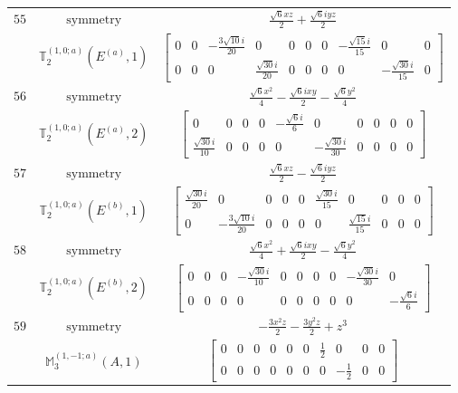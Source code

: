 \documentclass[fleqn,8pt,landscape]{jsarticle}
\begin{document}
\begin{longtable}{ccc}
$ 55 $ & $ \text{symmetry} $ & $ \frac{\sqrt{6} x z}{2} + \frac{\sqrt{6} i y z}{2} $ \\
$  $ & $ \mathbb{T}_{2}^{(1,0;a)}(E^{(a)},1) $ & $ \begin{bmatrix} 0 & 0 & - \frac{3 \sqrt{10} i}{20} & 0 & 0 & 0 & 0 & - \frac{\sqrt{15} i}{15} & 0 & 0 \\ 0 & 0 & 0 & \frac{\sqrt{30} i}{20} & 0 & 0 & 0 & 0 & - \frac{\sqrt{30} i}{15} & 0 \end{bmatrix} $ \\ \hline
$ 56 $ & $ \text{symmetry} $ & $ \frac{\sqrt{6} x^{2}}{4} - \frac{\sqrt{6} i x y}{2} - \frac{\sqrt{6} y^{2}}{4} $ \\
$  $ & $ \mathbb{T}_{2}^{(1,0;a)}(E^{(a)},2) $ & $ \begin{bmatrix} 0 & 0 & 0 & 0 & - \frac{\sqrt{6} i}{6} & 0 & 0 & 0 & 0 & 0 \\ \frac{\sqrt{30} i}{10} & 0 & 0 & 0 & 0 & - \frac{\sqrt{30} i}{30} & 0 & 0 & 0 & 0 \end{bmatrix} $ \\ \hline
$ 57 $ & $ \text{symmetry} $ & $ \frac{\sqrt{6} x z}{2} - \frac{\sqrt{6} i y z}{2} $ \\
$  $ & $ \mathbb{T}_{2}^{(1,0;a)}(E^{(b)},1) $ & $ \begin{bmatrix} \frac{\sqrt{30} i}{20} & 0 & 0 & 0 & 0 & \frac{\sqrt{30} i}{15} & 0 & 0 & 0 & 0 \\ 0 & - \frac{3 \sqrt{10} i}{20} & 0 & 0 & 0 & 0 & \frac{\sqrt{15} i}{15} & 0 & 0 & 0 \end{bmatrix} $ \\ \hline
$ 58 $ & $ \text{symmetry} $ & $ \frac{\sqrt{6} x^{2}}{4} + \frac{\sqrt{6} i x y}{2} - \frac{\sqrt{6} y^{2}}{4} $ \\
$  $ & $ \mathbb{T}_{2}^{(1,0;a)}(E^{(b)},2) $ & $ \begin{bmatrix} 0 & 0 & 0 & - \frac{\sqrt{30} i}{10} & 0 & 0 & 0 & 0 & - \frac{\sqrt{30} i}{30} & 0 \\ 0 & 0 & 0 & 0 & 0 & 0 & 0 & 0 & 0 & - \frac{\sqrt{6} i}{6} \end{bmatrix} $ \\ \hline
$ 59 $ & $ \text{symmetry} $ & $ - \frac{3 x^{2} z}{2} - \frac{3 y^{2} z}{2} + z^{3} $ \\
$  $ & $ \mathbb{M}_{3}^{(1,-1;a)}(A,1) $ & $ \begin{bmatrix} 0 & 0 & 0 & 0 & 0 & 0 & \frac{1}{2} & 0 & 0 & 0 \\ 0 & 0 & 0 & 0 & 0 & 0 & 0 & - \frac{1}{2} & 0 & 0 \end{bmatrix} $ \\ \hline

\end{longtable}
\end{document}
